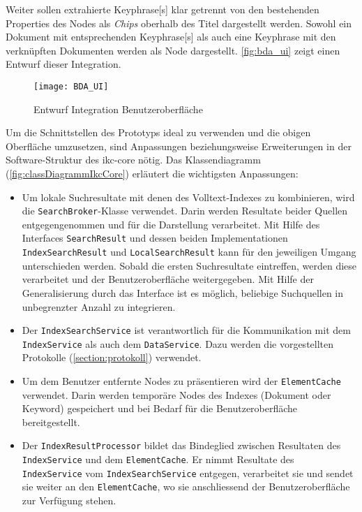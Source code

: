 Weiter sollen extrahierte \gls{Keyphrase}[s] klar getrennt von den bestehenden Properties des Nodes als \textit{Chips} oberhalb des Titel dargestellt werden. Sowohl ein Dokument mit entsprechenden \gls{Keyphrase}[s] als auch eine \gls{Keyphrase} mit den verknüpften Dokumenten werden als Node dargestellt. \autoref{fig:bda_ui} zeigt einen Entwurf dieser Integration. 

    \begin{figure}[H]
    \centering
    \texttt{[image: BDA\_UI]}
    \caption{Entwurf Integration Benutzeroberfläche}
    \label{fig:bda_ui}
    \end{figure}

Um die Schnittstellen des Prototyps ideal zu verwenden und die obigen Oberfläche umzusetzen, sind Anpassungen beziehungsweise Erweiterungen in der Software-Struktur des \gls{ikc-core} nötig. Das Klassendiagramm (\autoref{fig:classDiagrammIkcCore}) erläutert die wichtigsten Anpassungen:

\begin{itemize}
    \item Um lokale Suchresultate mit denen des Volltext-Indexes zu kombinieren, wird die \texttt{SearchBroker}-Klasse verwendet. Darin werden Resultate beider Quellen entgegengenommen und für die Darstellung verarbeitet. Mit Hilfe des Interfaces \texttt{SearchResult} und dessen beiden Implementationen \texttt{IndexSearchResult} und \texttt{LocalSearchResult} kann für den jeweiligen Umgang unterschieden werden. Sobald die ersten Suchresultate eintreffen, werden diese verarbeitet und der Benutzeroberfläche weitergegeben. Mit Hilfe der Generalisierung durch das Interface ist es möglich, beliebige Suchquellen in unbegrenzter Anzahl zu integrieren.\\ 
    \item Der \texttt{IndexSearchService} ist verantwortlich für die Kommunikation mit dem \texttt{IndexService} als auch dem \texttt{DataService}. Dazu werden die vorgestellten Protokolle (\autoref{section:protokoll}) verwendet.\\
    \item Um dem Benutzer entfernte Nodes zu präsentieren wird der \texttt{ElementCache} verwendet. Darin werden temporäre Nodes des Indexes (Dokument oder \gls{Keyword}) gespeichert und bei Bedarf für die Benutzeroberfläche bereitgestellt.
    \item Der \texttt{IndexResultProcessor} bildet das Bindeglied zwischen Resultaten des \texttt{IndexService} und dem \texttt{ElementCache}. Er nimmt Resultate des \texttt{IndexService} vom \texttt{IndexSearchService} entgegen, verarbeitet sie und sendet sie weiter an den \texttt{ElementCache}, wo sie anschliessend der Benutzeroberfläche zur Verfügung stehen.\\

\end{itemize}


